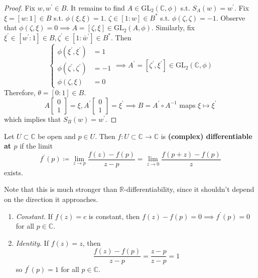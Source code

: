 \begin{proof}
    Fix $w, w^\prime \in B$. It remains to find $A \in \mathrm{GL}_2 (\mathbb{C}, \phi)$  s.t. $S_A (w) = w^\prime$. Fix $\xi = [w : 1] \in B$ s.t. $\phi(\xi , \xi) = 1$. $\zeta \in [1 : w] \in B^\ast$ s.t. $\phi(\zeta, \zeta) = -1$. Observe that $\phi(\zeta, \xi) = 0 \implies A = [\zeta, \xi] \in \mathrm{GL}_2 (A, \phi)$. Similarly, fix $\xi^\prime \in [w^\prime : 1] \in B, \zeta^\prime \in [1 : \bar{w}^\prime ] \in B^\ast$. Then 
    \begin{equation}
      \begin{cases} 
        \phi(\xi^\prime, \xi^\prime) & = 1 \\ 
        \phi(\zeta^\prime, \zeta^\prime) & = -1 \\ 
        \phi(\zeta, \xi) & = 0 
      \end{cases} \implies A^\prime = [\zeta^\prime, \xi^\prime] \in \mathrm{GL}_2 (\mathbb{C}, \phi)
    \end{equation}
    Therefore, $\theta = [0 : 1] \in B$. 
    \begin{equation}
      A \begin{bmatrix} 0 \\ 1 \end{bmatrix} = \xi, A^\prime \begin{bmatrix} 0 \\ 1 \end{bmatrix} = \xi^\prime \implies B = A^{\prime} \circ A^{-1} \text{ maps } \xi \mapsto \xi^\prime
    \end{equation}
    which implies that $S_B (w) = w^\prime$. 
  \end{proof}


  \begin{definition}[Differentiable]
    \label{def:differentiable}
    Let $U \subset \mathbb{C}$ be open and $p \in U$. Then $f: U \subset \mathbb{C} \to \mathbb{C}$ is \textbf{(complex) differentiable at $p$} if the limit 
    \begin{equation}
      f^\prime (p) \coloneqq \lim_{z \to p} \frac{f(z) - f(p)}{z - p} = \lim_{z \to 0} \frac{f(p + z) - f(p)}{z}
    \end{equation}
    exists. 
  \end{definition}

  Note that this is much stronger than $\mathbb{R}$-differentiability, since it shouldn't depend on the direction it approaches. 

  \begin{example}
    \label{ex:derivatives-of-elementary-functions}
    \begin{enumerate}
      \item \textit{Constant}. If $f(z) = c$ is constant, then $f(z) - f(p) = 0 \implies f^\prime (p) = 0$ for all $p \in \mathbb{C}$. 
      \item \textit{Identity}. If $f(z) = z$, then 
        \begin{equation}
          \frac{f(z) - f(p)}{z - p} = \frac{z - p}{z - p} = 1
        \end{equation}
        so $f^\prime (p) = 1$ for all $p \in \mathbb{C}$. 
    \end{enumerate}
  \end{example}

